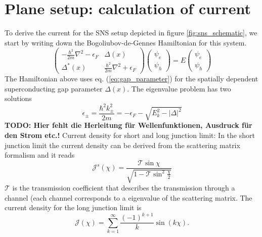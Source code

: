 \section{Plane setup: calculation of current}
To derive the current for the SNS setup depicted in figure \ref{fig:sns_schematic}, we start by writing down the Bogoliubov-de-Gennes Hamiltonian for this system.
\begin{equation}
\begin{pmatrix}
-\frac{\hbar^2}{2m} \nabla^2 - \epsilon_F & \Delta(x) \\
\Delta^*(x) & \frac{\hbar^2}{2m} \nabla^2 + \epsilon_F 
\end{pmatrix}
\begin{pmatrix}
\psi_e \\
\psi_h
\end{pmatrix} = E 
\begin{pmatrix}
\psi_e\\
\psi_h
\end{pmatrix}
\end{equation}
The Hamiltonian above uses eq. (\ref{eq:gap_parameter}) for the spatially dependent superconducting gap parameter $\Delta(x)$. The eigenvalue problem has two solutions
\begin{equation}
\epsilon_{\pm} = \frac{\hbar^2 k^2_{\pm}}{2m} = -\epsilon_F - \sqrt{E_k^2 - |\Delta|^2}
\end{equation}
\textbf{TODO: Hier fehlt die Herleitung f\"ur Wellenfunktionen, Ausdruck f\"ur den Strom etc.!}
Current density for short and long junction limit: 
In the short junction limit the current density can be derived from the scattering matrix formalism and it reads
\begin{equation}
\mathcal{J}^s (\chi) = \frac{\mathcal{T} \sin \chi}{\sqrt{1 - \mathcal{T} \sin^2 \frac{\chi}{2}}}
\end{equation}
$\mathcal{T}$ is the transmission coefficient that describes the transmission through a channel (each channel corresponds to a eigenvalue of the scattering matrix.
The current density for the long junction limit is
\begin{equation}
\mathcal{J}(\chi) = \sum_{k = 1}^{\infty} \frac{(-1)^{k+1}}{k} \sin( k \chi).
\end{equation}
